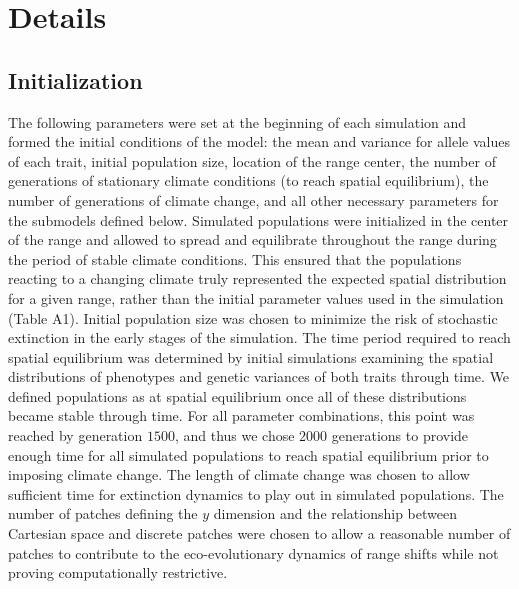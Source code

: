 \documentclass[11pt]{article}
\begin{document}
\section*{Details}
\subsection*{Initialization} 
The following parameters were set at the beginning of each simulation and formed the initial conditions of the model: the mean and variance for allele values of each trait, initial population size, location of the range center, the number of generations of stationary climate conditions (to reach spatial equilibrium), the number of generations of climate change, and all other necessary parameters for the submodels defined below. Simulated populations were initialized in the center of the range and allowed to spread and equilibrate throughout the range during the period of stable climate conditions. This ensured that the populations reacting to a changing climate truly represented the expected spatial distribution for a given range, rather than the initial parameter values used in the simulation (Table A1). Initial population size was chosen to minimize the risk of stochastic extinction in the early stages of the simulation. The time period required to reach spatial equilibrium was determined by initial simulations examining the spatial distributions of phenotypes and genetic variances of both traits through time. We defined populations as at spatial equilibrium once all of these distributions became stable through time. For all parameter combinations, this point was reached by generation $1500$, and thus we chose $2000$ generations to provide enough time for all simulated populations to reach spatial equilibrium prior to imposing climate change. The length of climate change was chosen to allow sufficient time for extinction dynamics to play out in simulated populations. The number of patches defining the $y$ dimension and the relationship between Cartesian space and discrete patches were chosen to allow a reasonable number of patches to contribute to the eco-evolutionary dynamics of range shifts while not proving computationally restrictive.
\end{document}
